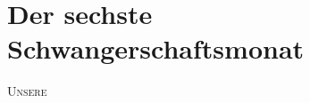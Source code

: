 
\chapter*{Der sechste Schwangerschaftsmonat}
\lettrine[lines=2, loversize=0.3, lraise=0]{\initfamily U}{nsere}
